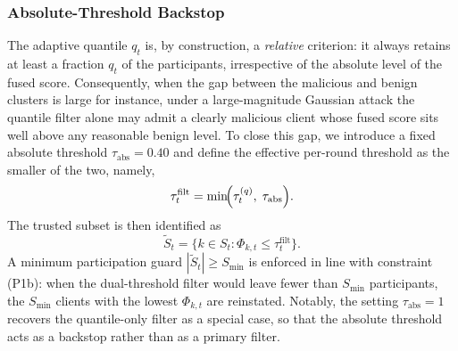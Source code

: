 \documentclass[journal]{IEEEtran}
\begin{document}
\subsubsection{Absolute-Threshold Backstop}
The adaptive quantile $q_t$ is, by construction, a \emph{relative} criterion: it always retains at least a fraction $q_t$ of the participants, irrespective of the absolute level of the fused score. Consequently, when the gap between the malicious and benign clusters is large for instance, under a large-magnitude Gaussian attack the quantile filter alone may admit a clearly malicious client whose fused score sits well above any reasonable benign level. To close this gap, we introduce a fixed absolute threshold $\tau_{\mathrm{abs}} = 0.40$ and define the effective per-round threshold as the smaller of the two, namely,
\begin{equation}
\tau_t^{\mathrm{filt}} = \min\!\Bigl(\tau_t^{(q)},\; \tau_{\mathrm{abs}}\Bigr).
\label{eq:dual_thresh}
\end{equation}
The trusted subset is then identified as
\begin{equation}
\widetilde{S}_t = \bigl\{k \in S_t : \Phi_{k,t} \le \tau_t^{\mathrm{filt}}\bigr\}.
\label{eq:filtered_set}
\end{equation}
A minimum participation guard $|\widetilde{S}_t| \ge S_{\min}$ is enforced in line with constraint (P1b): when the dual-threshold filter would leave fewer than $S_{\min}$ participants, the $S_{\min}$ clients with the lowest $\Phi_{k,t}$ are reinstated. Notably, the setting $\tau_{\mathrm{abs}}=1$ recovers the quantile-only filter as a special case, so that the absolute threshold acts as a backstop rather than as a primary filter.
\end{document}
